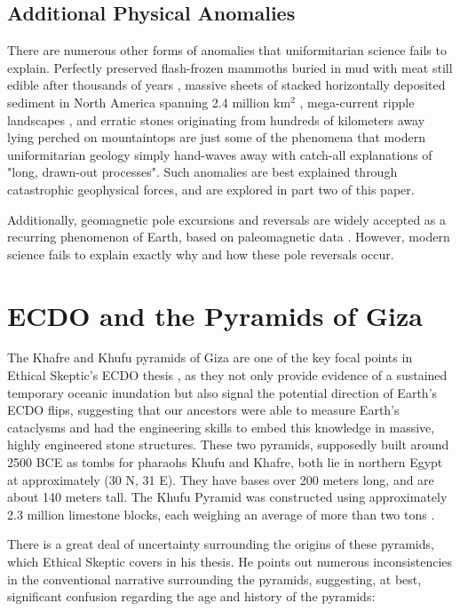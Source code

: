 \documentclass[10pt,twocolumn,letterpaper]{article}
\begin{document}
\subsection{Additional Physical Anomalies}

There are numerous other forms of anomalies that uniformitarian science fails to explain. Perfectly preserved flash-frozen mammoths buried in mud with meat still edible after thousands of years \cite{17,18,19}, massive sheets of stacked horizontally deposited sediment in North America spanning 2.4 million km$^2$ \cite{21}, mega-current ripple landscapes \cite{22}, and erratic stones originating from hundreds of kilometers away lying perched on mountaintops \cite{23,26} are just some of the phenomena that modern uniformitarian geology simply hand-waves away with catch-all explanations of "long, drawn-out processes". Such anomalies are best explained through catastrophic geophysical forces, and are explored in part two of this paper.

Additionally, geomagnetic pole excursions and reversals are widely accepted as a recurring phenomenon of Earth, based on paleomagnetic data \cite{35,40,41}. However, modern science fails to explain exactly why and how these pole reversals occur.

\section{ECDO and the Pyramids of Giza}

The Khafre and Khufu pyramids of Giza are one of the key focal points in Ethical Skeptic's ECDO thesis \cite{27}, as they not only provide evidence of a sustained temporary oceanic inundation but also signal the potential direction of Earth's ECDO flips, suggesting that our ancestors were able to measure Earth's cataclysms and had the engineering skills to embed this knowledge in massive, highly engineered stone structures. These two pyramids, supposedly built around 2500 BCE as tombs for pharaohs Khufu and Khafre, both lie in northern Egypt at approximately (30 N, 31 E). They have bases over 200 meters long, and are about 140 meters tall. The Khufu Pyramid was constructed using approximately 2.3 million limestone blocks, each weighing an average of more than two tons \cite{24, 25}.

There is a great deal of uncertainty surrounding the origins of these pyramids, which Ethical Skeptic covers in his thesis. He points out numerous inconsistencies in the conventional narrative surrounding the pyramids, suggesting, at best, significant confusion regarding the age and history of the pyramids:
\end{document}
